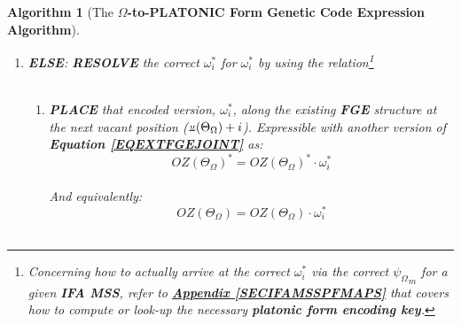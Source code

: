 \documentclass[a4paper, 18pt]{book} %
\newtheorem{alg}{Algorithm}
\newcommand{\invpi}{\rotatebox[origin=c]{180}{$\pi$}}
\begin{document}
\begin{alg}[The \textbf{$\Omega$-to-PLATONIC Form Genetic Code Expression Algorithm}]
\begin{enumerate}
{\begin{enumerate}
{\begin{enumerate}
{\begin{enumerate}
{		}
		\item \textbf{PROCEED} to the next symbol in \textbf{IFA MSS}, $\overset{>}{OZ(\Theta_\Omega)}$\\ (loop from \textbf{Step\#2(e))}.
		\end{enumerate}
	}
	\item { \textbf{ELSE}: \textbf{RESOLVE} the correct  $\boxed{\omega_i^*}$  for  $\omega_i^*$  by using the relation\footnote{Concerning how to actually arrive at the correct $\boxed{\omega_i^*}$ via the correct $\boxed{\psi_\Omega}_m$ for a given \textbf{IFA MSS}, refer to \textbf{\hyperref[SECIFAMSSPFMAPS]{Appendix \ref{SECIFAMSSPFMAPS}}} that covers how to compute or look-up the necessary \textbf{platonic form encoding key}.}\\


\\



	\begin{enumerate}
	\item{\textbf{PLACE} that encoded version, $\boxed{\omega_i^*}$, along the existing \textbf{FGE} structure at the next vacant position ($\invpi(\Theta_\Omega)+i$). Expressible with another version of \textbf{Equation \ref{EQEXTFGEJOINT}} as:\\
	
	\begin{equation}
	\label{EQEXTFGEPF}
		\boxed{OZ(\Theta_\Omega)}^* = \boxed{OZ(\Theta_\Omega)}^* \cdot \boxed{\omega_i^*}
		\end{equation}\\
		
		And equivalently:\\
		
		\begin{equation}
		\label{EQEXTFGEPFSUF}
		\boxed{OZ(\Theta_\Omega)} = \boxed{OZ(\Theta_\Omega)} \cdot \boxed{\omega_i^*}
		\end{equation}\\
		
}
\end{enumerate}}
\end{enumerate}}
\end{enumerate}}
\end{enumerate}
\end{alg}
\end{document}

